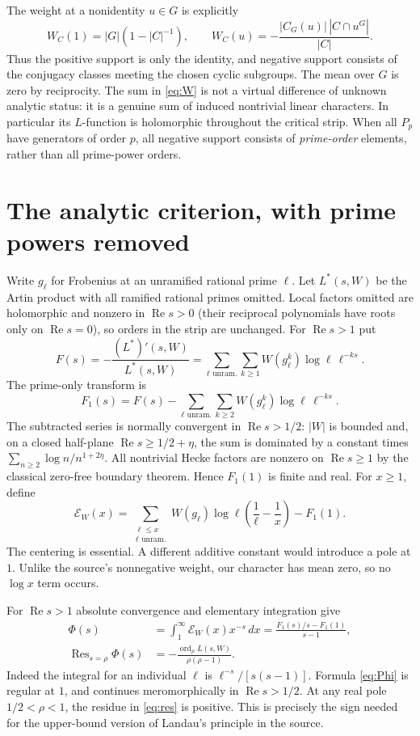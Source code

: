 \documentclass[11pt]{article}
\theoremstyle{remark}\newtheorem{remark}[theorem]{Remark}
\DeclareMathOperator{\ord}{ord}
\DeclareMathOperator{\Ree}{Re}
\begin{document}
The weight at a nonidentity $u\in G$ is explicitly
\begin{equation}\label{eq:weights}
 W_C(1)=|G|(1-|C|^{-1}),\qquad
 W_C(u)=-\frac{|C_G(u)|\,|C\cap u^G|}{|C|}.
\end{equation}
Thus the positive support is only the identity, and negative support
consists of the conjugacy classes meeting the chosen cyclic subgroups.
The mean over $G$ is zero by reciprocity. The sum in \eqref{eq:W} is
not a virtual difference of unknown analytic status: it is a genuine
sum of induced nontrivial linear characters. In particular its
$L$-function is holomorphic throughout the critical strip. When all
$P_p$ have generators of order $p$, all negative support consists of
\emph{prime-order} elements, rather than all prime-power orders.

\section{The analytic criterion, with prime powers removed}
Write $g_\ell$ for Frobenius at an unramified rational prime $\ell$.
Let $L^*(s,W)$ be the Artin product with all ramified rational primes
omitted. Local factors omitted are holomorphic and nonzero in
$\Ree s>0$ (their reciprocal polynomials have roots only on
$\Ree s=0$), so orders in the strip are unchanged. For $\Ree s>1$ put
\[
 F(s)=-\frac{(L^*)'(s,W)}{L^*(s,W)}
 =\sum_{\ell\text{ unram.}}\sum_{k\ge1}
    W(g_\ell^k)\log\ell\,\ell^{-ks}.
\]
The prime-only transform is
\[
 F_1(s)=F(s)-\sum_{\ell\text{ unram.}}\sum_{k\ge2}
    W(g_\ell^k)\log\ell\,\ell^{-ks}.
\]
The subtracted series is normally convergent in $\Ree s>1/2$:
$|W|$ is bounded and, on a closed half-plane $\Ree s\ge1/2+\eta$,
the sum is dominated by a constant times $\sum_{n\ge2}\log n/n^{1+2\eta}$.
All nontrivial Hecke factors are nonzero on $\Ree s\ge1$ by the
classical zero-free boundary theorem. Hence $F_1(1)$ is finite and
real. For $x\ge1$, define
\begin{equation}\label{eq:E}
 \mathcal E_W(x)=\sum_{\substack{\ell\le x\\\ell\text{ unram.}}}
 W(g_\ell)\log\ell\left(\frac1\ell-\frac1x\right)-F_1(1).
\end{equation}
The centering is essential. A different additive constant would
introduce a pole at $1$. Unlike the source's nonnegative weight,
our character has mean zero, so no $\log x$ term occurs.

For $\Ree s>1$ absolute convergence and elementary integration give
\begin{align}
 \Phi(s)&=\int_1^\infty\mathcal E_W(x)x^{-s}\,dx
 =\frac{F_1(s)/s-F_1(1)}{s-1},\label{eq:Phi}\\
 \operatorname{Res}_{s=\rho}\Phi(s)
 &=-\frac{\ord_\rho L(s,W)}{\rho(\rho-1)}.
 \label{eq:res}
\end{align}
Indeed the integral for an individual $\ell$ is
$\ell^{-s}/[s(s-1)]$. Formula \eqref{eq:Phi} is regular at $1$, and
continues meromorphically in $\Ree s>1/2$. At any real pole
$1/2<\rho<1$, the residue in \eqref{eq:res} is positive.
This is precisely the sign needed for the upper-bound version of
Landau's principle in the source.
\end{document}
